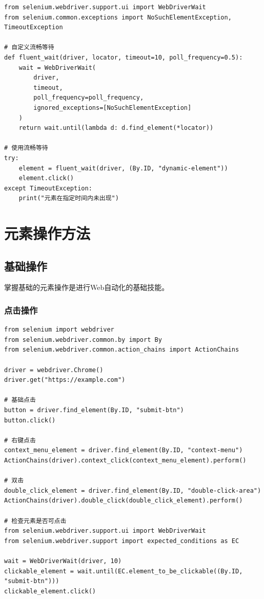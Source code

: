 \begin{lstlisting}[style=demostyle,numbers=none]
from selenium.webdriver.support.ui import WebDriverWait
from selenium.common.exceptions import NoSuchElementException, TimeoutException

# 自定义流畅等待
def fluent_wait(driver, locator, timeout=10, poll_frequency=0.5):
    wait = WebDriverWait(
        driver, 
        timeout, 
        poll_frequency=poll_frequency,
        ignored_exceptions=[NoSuchElementException]
    )
    return wait.until(lambda d: d.find_element(*locator))

# 使用流畅等待
try:
    element = fluent_wait(driver, (By.ID, "dynamic-element"))
    element.click()
except TimeoutException:
    print("元素在指定时间内未出现")
\end{lstlisting}

\section{元素操作方法}

\subsection{基础操作}

掌握基础的元素操作是进行Web自动化的基础技能。

\subsubsection{点击操作}

\begin{lstlisting}[style=demostyle,numbers=none]
from selenium import webdriver
from selenium.webdriver.common.by import By
from selenium.webdriver.common.action_chains import ActionChains

driver = webdriver.Chrome()
driver.get("https://example.com")

# 基础点击
button = driver.find_element(By.ID, "submit-btn")
button.click()

# 右键点击
context_menu_element = driver.find_element(By.ID, "context-menu")
ActionChains(driver).context_click(context_menu_element).perform()

# 双击
double_click_element = driver.find_element(By.ID, "double-click-area")
ActionChains(driver).double_click(double_click_element).perform()

# 检查元素是否可点击
from selenium.webdriver.support.ui import WebDriverWait
from selenium.webdriver.support import expected_conditions as EC

wait = WebDriverWait(driver, 10)
clickable_element = wait.until(EC.element_to_be_clickable((By.ID, "submit-btn")))
clickable_element.click()
\end{lstlisting}

